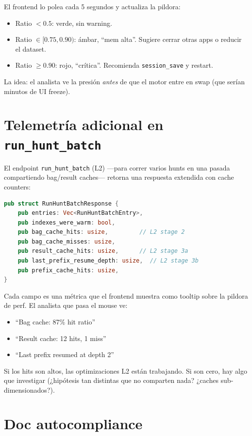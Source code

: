 \noindent
El frontend lo polea cada 5 segundos y actualiza la pildora:

\begin{itemize}
    \item Ratio \(< 0.5\): verde, sin warning.
    \item Ratio \(\in [0.75, 0.90)\): ámbar, ``mem alta''. Sugiere
    cerrar otras apps o reducir el dataset.
    \item Ratio \(\geq 0.90\): rojo, ``crítica''. Recomienda
    \texttt{session\_save} y restart.
\end{itemize}

\noindent
La idea: el analista ve la presión \emph{antes} de que el motor
entre en swap (que serían minutos de UI freeze).

\section{Telemetría adicional en \texttt{run\_hunt\_batch}}

El endpoint \texttt{run\_hunt\_batch} (L2) ---para correr varios
hunts en una pasada compartiendo bag/result caches--- retorna una
respuesta extendida con cache counters:

\begin{lstlisting}[language=Rust]
pub struct RunHuntBatchResponse {
    pub entries: Vec<RunHuntBatchEntry>,
    pub indexes_were_warm: bool,
    pub bag_cache_hits: usize,         // L2 stage 2
    pub bag_cache_misses: usize,
    pub result_cache_hits: usize,      // L2 stage 3a
    pub last_prefix_resume_depth: usize,  // L2 stage 3b
    pub prefix_cache_hits: usize,
}
\end{lstlisting}

\noindent
Cada campo es una métrica que el frontend muestra como tooltip
sobre la pildora de perf. El analista que pasa el mouse ve:
\begin{itemize}
    \item ``Bag cache: 87\% hit ratio''
    \item ``Result cache: 12 hits, 1 miss''
    \item ``Last prefix resumed at depth 2''
\end{itemize}

\noindent
Si los hits son altos, las optimizaciones L2 están trabajando. Si
son cero, hay algo que investigar (¿hipótesis tan distintas que no
comparten nada? ¿caches sub-dimensionados?).

\section{Doc autocompliance}


